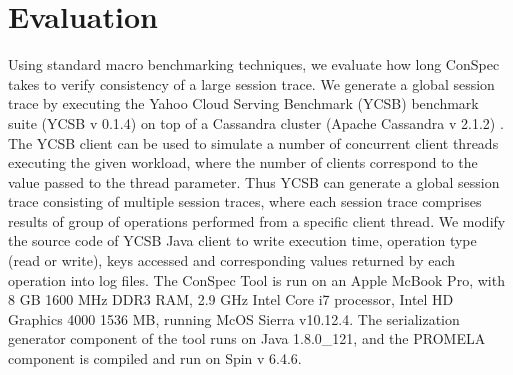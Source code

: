 \documentclass[journal,compsoc]{IEEEtran}
\begin{document}
 \section{Evaluation}\label{sec:eval}
   Using standard macro benchmarking techniques, we evaluate how long ConSpec takes to verify consistency of a large session trace.   We generate a global session trace by executing the Yahoo Cloud Serving Benchmark (YCSB) benchmark suite (YCSB v 0.1.4)  \cite{Cooper:2010:BCS:1807128.1807152}  on top of a Cassandra cluster (Apache Cassandra v 2.1.2)  \cite{Lakshman:2010:CDS:1773912.1773922}.  %
 The YCSB client can be used to simulate a number of concurrent client threads executing the given workload, where the number of clients correspond to the value passed to the thread parameter. Thus YCSB can generate a global session trace consisting of multiple session traces, where each session trace comprises results of group of operations performed from a specific client thread.    We modify the source code of YCSB Java client to write execution time, operation type (read or write), keys accessed and corresponding values returned by each operation into log files. The ConSpec Tool is run on an Apple McBook Pro, with 8 GB 1600 MHz DDR3 RAM,  2.9 GHz Intel Core i7 processor, Intel HD Graphics 4000 1536 MB, running McOS Sierra v10.12.4. The serialization generator component of the tool runs on Java 1.8.0\_121, and the PROMELA component is compiled and run on Spin v 6.4.6.  
\end{document}
